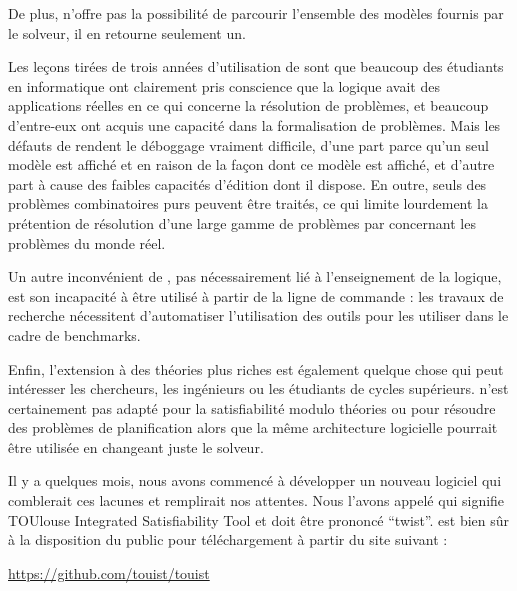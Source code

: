 De plus, \satoulouse n'offre pas la possibilité de parcourir l'ensemble des modèles fournis par le solveur, il en retourne seulement un.






\color{red}
Les leçons tirées de trois années d'utilisation de \satoulouse sont que beaucoup des étudiants en informatique ont clairement pris conscience que la logique avait des applications réelles en ce qui concerne la résolution de problèmes, et beaucoup d'entre-eux ont acquis une capacité dans la formalisation de problèmes. Mais les défauts de \satoulouse rendent le déboggage vraiment difficile, d'une part parce qu'un seul modèle est affiché et en raison de la façon dont ce modèle est affiché, et d'autre part à cause des faibles capacités d'édition dont il dispose. En outre, seuls des problèmes combinatoires purs peuvent être traités, ce qui limite lourdement la prétention de résolution d'une large gamme de problèmes par \satoulouse concernant les problèmes du monde réel.

Un autre inconvénient de \satoulouse, pas nécessairement lié à l'enseignement de la logique, est son incapacité à être utilisé à partir de la ligne de commande : les travaux de recherche nécessitent d'automatiser l'utilisation des outils pour les utiliser dans le cadre de benchmarks.

Enfin, l'extension à des théories plus riches est également quelque chose qui peut intéresser les chercheurs, les ingénieurs ou les étudiants de cycles supérieurs. \satoulouse n'est certainement pas adapté pour la satisfiabilité modulo théories ou pour résoudre des problèmes de planification alors que la même architecture logicielle pourrait être utilisée en changeant juste le solveur.


Il y a quelques mois, nous avons commencé à développer un nouveau logiciel qui comblerait ces lacunes et remplirait nos attentes. Nous l'avons appelé \touist qui signifie TOUlouse Integrated Satisfiability Tool et doit être prononcé ``twist''.
 \touist est bien sûr à la disposition du public pour téléchargement à partir du site suivant :
\begin{center}\url{ https://github.com/touist/touist }\end{center}
\color{black}

